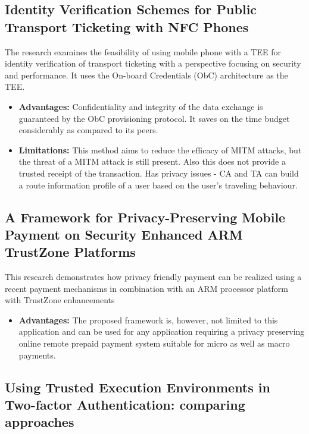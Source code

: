 \documentclass[conference]{IEEEtran}
\begin{document}
\subsection{Identity Verification Schemes for Public Transport Ticketing with NFC Phones}
\cite{misc4} The research examines the feasibility of using mobile phone with a TEE for identity verification of transport ticketing with a perspective focusing on security and performance. It uses the On-board Credentials (ObC) architecture as the TEE.
\begin{itemize}
    \item \textbf{Advantages:}  Confidentiality and integrity of the data exchange is guaranteed by the ObC provisioning protocol. It saves on the time budget considerably as compared to its peers.
    \item \textbf{Limitations:} This method aims to reduce the efficacy of MITM attacks, but the threat of a MITM attack is still present. Also this does not provide a trusted receipt of the transaction. Has privacy issues - CA and TA can build a route information profile of a user based on the user’s traveling behaviour.
\end{itemize}


\subsection{A Framework for Privacy-Preserving Mobile Payment on Security Enhanced ARM TrustZone Platforms}
\cite{misc5} This research demonstrates how privacy friendly payment can be realized using a recent payment mechanisms in combination with an ARM processor platform with TrustZone enhancements
\begin{itemize}
    \item \textbf{Advantages:}  The proposed framework is, however, not limited to this application and can be used for any application requiring a privacy preserving online remote prepaid payment system suitable for micro as well as macro payments.
\end{itemize}


\subsection{Using Trusted Execution Environments in Two-factor Authentication: comparing approaches}
\end{document}
